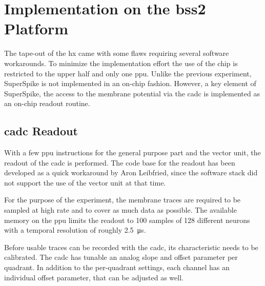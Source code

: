 \section{Implementation on the \acrshort{bss2} Platform}
The tape-out of the \gls{hx} came with some flaws requiring several software workarounds. To minimize the implementation effort the use of the chip is restricted to the upper half and only one \gls{ppu}. Unlike the previous experiment, SuperSpike is not implemented in an on-chip fashion. However, a key element of SuperSpike, the access to the membrane potential via the \gls{cadc} is implemented as an on-chip readout routine.


\subsection{\gls{cadc} Readout}
With a few \gls{ppu} instructions for the general purpose part and the vector unit, the readout of the \gls{cadc} is performed. The code base for the readout has been developed as a quick workaround by Aron Leibfried, since the software stack did not support the use of the vector unit at that time.

For the purpose of the experiment, the membrane traces are required to be sampled at high rate and to cover as much data as possible. The available memory on the \gls{ppu} limits the readout to 100 samples of 128 different neurons with a temporal resolution of roughly \SI{2.5}{\micro \s}. 

Before usable traces can be recorded with the \gls{cadc}, its characteristic needs to be calibrated. The \gls{cadc} has tunable an analog slope and offset parameter per quadrant. In addition to the per-quadrant settings, each channel has an individual offset parameter, that can be adjusted as well.

